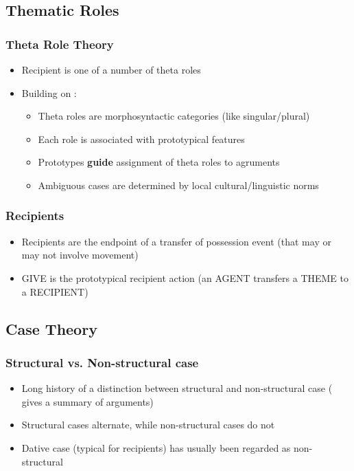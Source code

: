 \documentclass{beamer}
\begin{document}
\subsection{Thematic Roles}
\begin{frame}
	\frametitle{Theta Role Theory}
	\begin{itemize}
		\item Recipient is one of a number of theta roles
		\item Building on \cite{Dowty.1991}:
			\begin{itemize}
				\item Theta roles are morphosyntactic categories (like singular/plural)
				\item Each role is associated with prototypical features
				\item Prototypes \textbf{guide} assignment of theta roles to agruments
				\item Ambiguous cases are determined by local cultural/linguistic norms
			\end{itemize}
	\end{itemize}
\end{frame}

\begin{frame}
	\frametitle{Recipients}
	\begin{itemize}
		\item Recipients are the endpoint of a transfer of possession event (that may or may not involve movement)
		\item GIVE is the prototypical recipient action (an AGENT transfers a THEME to a RECIPIENT)
	\end{itemize}
\end{frame}

\subsection{Case Theory}
\begin{frame}
	\frametitle{Structural vs. Non-structural case}
	\begin{itemize}
		\item Long history of a distinction between structural and non-structural case (\citet{Woolford.2006} gives a summary of arguments)
		\item Structural cases alternate, while non-structural cases do not
		\item Dative case (typical for recipients) has usually been regarded as non-structural
	\end{itemize}
\end{frame}
\end{document}
